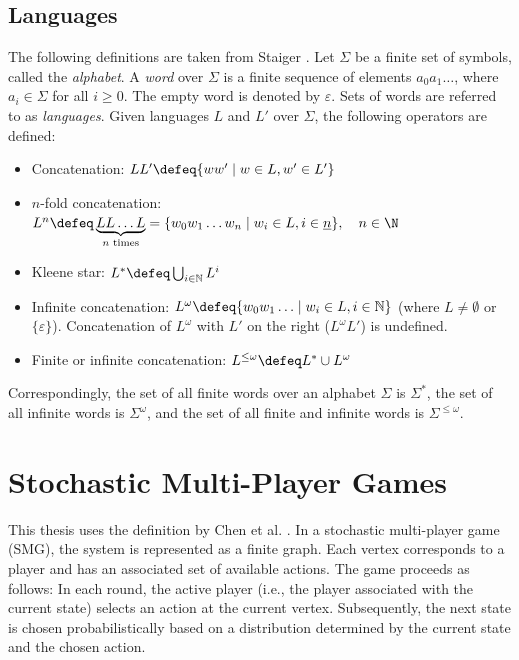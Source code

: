 \subsection{Languages}
The following definitions are taken from Staiger \cite{staiger_omega-languages_1997}. Let $\Sigma$ be a finite set of symbols, called the \textit{alphabet}. A \textit{word} over $\Sigma$ is a finite sequence of elements $a_0a_1\ldots$, where $a_i \in \Sigma$ for all $i \geq 0$. The empty word is denoted by $\varepsilon$. Sets of words are referred to as \textit{languages}. Given languages $L$ and $L'$ over $\Sigma$, the following operators are defined:
\begin{itemize}
    \item Concatenation: $LL' \defeq \{ ww' \mid w \in L, w' \in L' \}$
    \item $n$-fold concatenation: $L^n \defeq \underbrace{L L \ldots L}_{n \text{ times}} = \{ w_0w_1\ldots w_n \mid w_i \in L, i \in \underline{n} \},\quad n\in\N$
    \item Kleene star: $L^\ast \defeq \bigcup_{i \in \mathbb{N}} L^i$
    \item Infinite concatenation: $L^\omega \defeq \{ w_0w_1\ldots \mid w_i \in L, i \in \mathbb{N} \}$ (where $L \neq \emptyset$ or $\{\varepsilon\}$). Concatenation of $L^\omega$ with $L'$ on the right ($L^\omega L'$) is undefined.
    \item Finite or infinite concatenation: $L^{\leq\omega} \defeq L^\ast \cup L^\omega$
\end{itemize}

Correspondingly, the set of all finite words over an alphabet $\Sigma$ is $\Sigma^\ast$, the set of all infinite words is $\Sigma^\omega$, and the set of all finite and infinite words is $\Sigma^{\leq\omega}$.




\section{Stochastic Multi-Player Games}
This thesis uses the definition by Chen et al. \cite[Definition 1]{chen_automatic_2013}. In a stochastic multi-player game (SMG), the system is represented as a finite graph. Each vertex corresponds to a player and has an associated set of available actions. The game proceeds as follows: In each round, the active player (i.e., the player associated with the current state) selects an action at the current vertex. Subsequently, the next state is chosen probabilistically based on a distribution determined by the current state and the chosen action.
\vspace{2mm}

